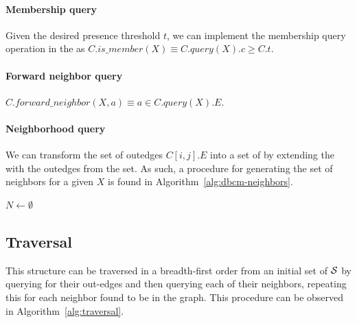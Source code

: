 \paragraph*{Membership query} Given the desired presence threshold $t$, we can implement the membership query operation in the \dBCM as $C.\mathit{is\_member}(X) \equiv C.\mathit{query}(X).c \geq C.t$.

\paragraph*{Forward neighbor query} $C.\mathit{forward\_neighbor}(X, a) \equiv a\in C.\mathit{query}(X).E$.

\paragraph*{Neighborhood query} We can transform the set of outedges $C[i,j].E$ into a set of  by extending the \kmer with the outedges from the set. As such, a procedure for generating the set of neighbors for a given \kmer $X$ is found in Algorithm~\ref{alg:dbcm-neighbors}.

\begin{algorithm}
	\caption{$C.\mathit{neighbors}(X)$}\label{alg:dbcm-neighbors}
  $N \gets \emptyset$\\
\end{algorithm}

\subsection{\dBCM Traversal}
\label{subsubsec:dbcm-navigation}

This structure can be traversed in a breadth-first order from an initial set of  $\strsetname{S}$ by querying for their out-edges and then querying each of their neighbors, repeating this for each neighbor found to be in the graph. This procedure can be observed in Algorithm~\ref{alg:traversal}.

